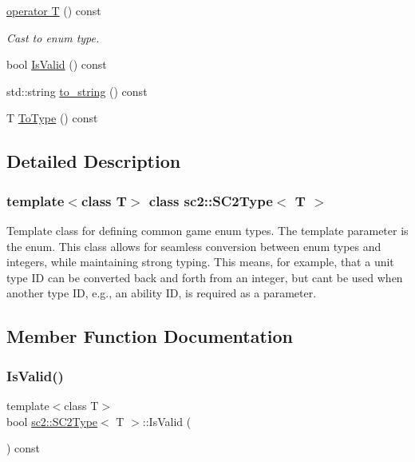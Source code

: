 \begin{DoxyCompactItemize}
\hyperlink{classsc2_1_1_s_c2_type_a16ef14791e484bcb2708d262fbfbc46f}{operator T} () const
\begin{DoxyCompactList}\small\item\em Cast to enum type. \end{DoxyCompactList}\item 
bool \hyperlink{classsc2_1_1_s_c2_type_a359fd3f5911b611089dac072f2ba528f}{Is\+Valid} () const
\item 
std\+::string \hyperlink{classsc2_1_1_s_c2_type_a25533b72e301be4064d80a13c82dc506}{to\+\_\+string} () const
\item 
T \hyperlink{classsc2_1_1_s_c2_type_ada2d70972edaa615780f86165b7e87a3}{To\+Type} () const
\end{DoxyCompactItemize}


\subsection{Detailed Description}
\subsubsection*{template$<$class T$>$\newline
class sc2\+::\+S\+C2\+Type$<$ T $>$}

Template class for defining common game enum types. The template parameter is the enum. This class allows for seamless conversion between enum types and integers, while maintaining strong typing. This means, for example, that a unit type ID can be converted back and forth from an integer, but can\textquotesingle{}t be used when another type ID, e.\+g., an ability ID, is required as a parameter. 

\subsection{Member Function Documentation}
\mbox{\label{classsc2_1_1_s_c2_type_a359fd3f5911b611089dac072f2ba528f}} 
\subsubsection{\texorpdfstring{Is\+Valid()}{IsValid()}}
{\footnotesize\ttfamily template$<$class T$>$ \\
bool \hyperlink{classsc2_1_1_s_c2_type}{sc2\+::\+S\+C2\+Type}$<$ T $>$\+::Is\+Valid (\begin{DoxyParamCaption}{ }\end{DoxyParamCaption}) const\hspace{0.3cm}{\ttfamily [inline]}}

